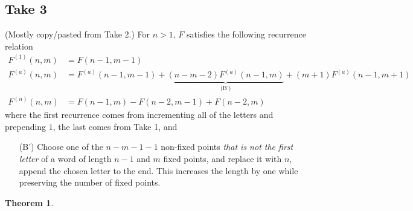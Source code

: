 \documentclass{article}
\newtheorem{theorem}[theo]{Theorem}
\begin{document}
\subsection{Take 3} (Mostly copy/pasted from Take 2.)
  For $n > 1$, $F$ satisfies the following recurrence relation \begin{align}
    F^{(1)}(n, m) &= F(n-1, m-1) \\
    F^{(a)}(n, m) &=
      F^{(a)}(n-1, m-1) +
      \underbrace{(n - m - 2)F^{(a)}(n - 1, m)}_{\text{(B')}} +
      (m + 1)F^{(a)}(n-1, m + 1) \\
    F^{(n)}(n, m) &= F(n-1, m) - F(n-2,m-1) + F(n-2, m)
  \end{align} where the first recurrence comes from incrementing all of the letters and prepending $1$, the last comes from Take 1, and \begin{enumerate}[(B)]
    \item[(B')] Choose one of the $n - m - 1 - 1$ non-fixed points \textit{that is not the first letter} of a word of length $n-1$ and $m$
    fixed points, and replace it with $n$, append the chosen letter to the end.
    This increases the length by one while preserving the number of fixed points.
  \end{enumerate}
  \begin{theorem}
  \end{theorem}
\end{document}
